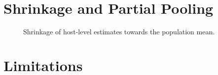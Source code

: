 \documentclass[11pt,a4paper]{article}
\begin{document}
\section{Shrinkage and Partial Pooling}\label{sec:pooling}
%
%

\begin{figure}[htbp]
\centering
\caption{Shrinkage of host-level estimates towards the population mean.}
\label{fig:shrinkage}
\end{figure}

\section{Limitations}
\end{document}
